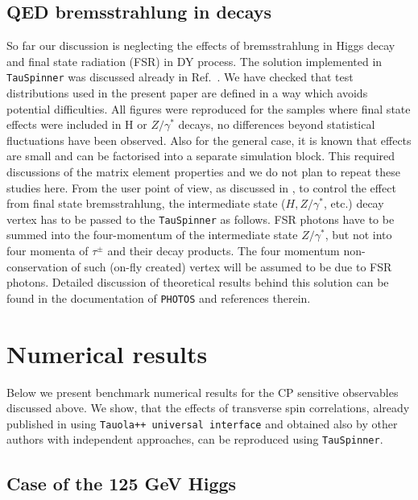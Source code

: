 \documentclass[12pt]{article}
\begin{document}
\subsection{QED bremsstrahlung in decays}

So far our discussion is neglecting the  effects of bremsstrahlung in Higgs decay and final state radiation (FSR)
in DY  process. The solution implemented in {\tt TauSpinner} was discussed already in Ref.~\cite{Czyczula:2012ny}.
We have checked that test distributions used in the present paper are defined in a way which avoids potential
difficulties. All figures were reproduced for the samples where final state effects were 
included in H or $Z/\gamma^*$ decays, no differences beyond statistical fluctuations have been observed.
Also for the general case, 
it is  known that effects are small and can be factorised into a separate 
simulation block. This required discussions of the matrix element properties and we do not plan to repeat these studies here.
From the user point of view,
as discussed in \cite{Czyczula:2012ny}, to control the effect from final state bremsstrahlung, the intermediate state ($H,Z/\gamma^*$, etc.) 
decay vertex
has to be passed to the {\tt TauSpinner} as follows. FSR photons have to 
be summed into   the  four-momentum of the intermediate state $Z/\gamma^*$, but not into four momenta of $\tau^\pm$ and their decay products.
The four momentum non-conservation of such (on-fly created) vertex will be assumed to be due to FSR photons.
Detailed discussion of theoretical results behind  this solution can be found 
in the documentation of  {\tt PHOTOS} \cite{Davidson:2010ew}  and references therein.


\section {Numerical results }

Below we present benchmark numerical results for the  CP sensitive observables
discussed above. 
We show, that the effects of transverse spin correlations, already published in \cite{Davidson:2010rw} using {\tt Tauola++ universal interface} 
and obtained also by other authors with independent approaches, can be reproduced using {\tt TauSpinner}.

\subsection {Case of the 125 GeV Higgs }
\label{sec:Case125}
\end{document}
